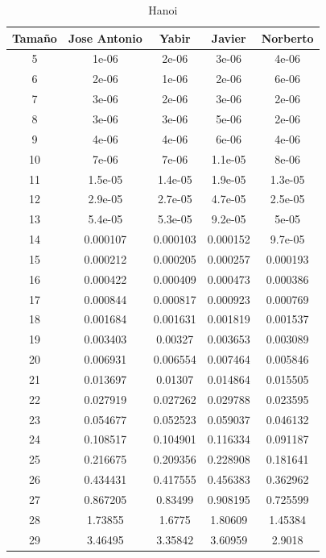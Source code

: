 \documentclass[11pt,a4paper]{article}
\begin{document}
\begin{table}[h]
	\centering
	\caption{Hanoi}
	\begin{tabular}{ | c | c  | c | c | c | }
		\hline
		Tama\~no & Jose Antonio & Yabir & Javier & Norberto\\
		\hline
		5	&	1e-06	&	2e-06	&	3e-06	&	4e-06	\\
		6	&	2e-06	&	1e-06	&	2e-06	&	6e-06	\\
		7	&	3e-06	&	2e-06	&	3e-06	&	2e-06	\\
		8	&	3e-06	&	3e-06	&	5e-06	&	2e-06	\\
		9	&	4e-06	&	4e-06	&	6e-06	&	4e-06	\\
		10	&	7e-06	&	7e-06	&	1.1e-05	&	8e-06	\\
		11	&	1.5e-05	&	1.4e-05	&	1.9e-05	&	1.3e-05	\\
		12	&	2.9e-05	&	2.7e-05	&	4.7e-05	&	2.5e-05	\\
		13	&	5.4e-05	&	5.3e-05	&	9.2e-05	&	5e-05	\\
		14	&	0.000107	&	0.000103	&	0.000152	&	9.7e-05	\\
		15	&	0.000212	&	0.000205	&	0.000257	&	0.000193	\\
		16	&	0.000422	&	0.000409	&	0.000473	&	0.000386	\\
		17	&	0.000844	&	0.000817	&	0.000923	&	0.000769	\\
		18	&	0.001684	&	0.001631	&	0.001819	&	0.001537	\\
		19	&	0.003403	&	0.00327	&	0.003653	&	0.003089	\\
		20	&	0.006931	&	0.006554	&	0.007464	&	0.005846	\\
		21	&	0.013697	&	0.01307	&	0.014864	&	0.015505	\\
		22	&	0.027919	&	0.027262	&	0.029788	&	0.023595	\\
		23	&	0.054677	&	0.052523	&	0.059037	&	0.046132	\\
		24	&	0.108517	&	0.104901	&	0.116334	&	0.091187	\\
		25	&	0.216675	&	0.209356	&	0.228908	&	0.181641	\\
		26	&	0.434431	&	0.417555	&	0.456383	&	0.362962	\\
		27	&	0.867205	&	0.83499	&	0.908195	&	0.725599	\\
		28	&	1.73855	&	1.6775	&	1.80609	&	1.45384	\\
		29	&	3.46495	&	3.35842	&	3.60959	&	2.9018	\\
		\hline
	\end{tabular}
\end{table}
\end{document}
